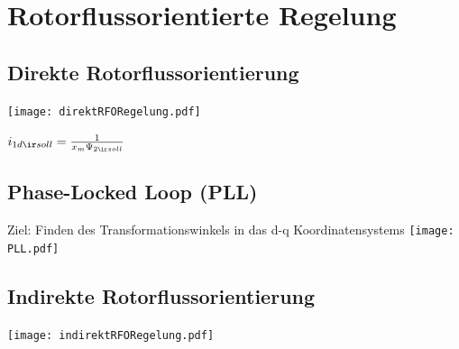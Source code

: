 \documentclass[german]{latex4ei_fs}
\begin{document}
\section{Rotorflussorientierte Regelung} 

\begin{sectionbox}

\subsection{Direkte Rotorflussorientierung} 

\texttt{[image: direktRFORegelung.pdf]}


$i_{1d \ir soll} = \frac{1}{x_{m} \Psi_{2\ir soll}}$
\end{sectionbox}

\begin{sectionbox}

\subsection{Phase-Locked Loop (PLL)} 

Ziel: Finden des Transformationswinkels in das d-q Koordinatensystems
\texttt{[image: PLL.pdf]}
\end{sectionbox}
\begin{sectionbox}

\subsection{Indirekte Rotorflussorientierung} 
\texttt{[image: indirektRFORegelung.pdf]}
\end{sectionbox}
\end{document}
